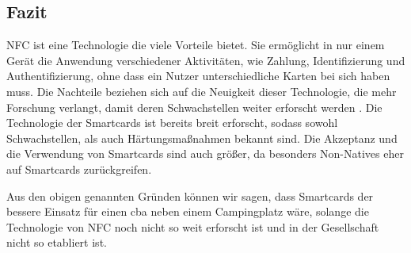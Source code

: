 \subsection{Fazit}

NFC ist eine Technologie die viele Vorteile bietet. Sie ermöglicht in nur einem Gerät die Anwendung
verschiedener Aktivitäten, wie Zahlung, Identifizierung und Authentifizierung, ohne dass ein Nutzer 
unterschiedliche Karten bei sich haben muss. Die Nachteile beziehen sich auf die Neuigkeit dieser Technologie,
die mehr Forschung verlangt, damit deren Schwachstellen weiter erforscht werden \cite{refart:ALSI}. Die
Technologie der Smartcards ist bereits breit erforscht, sodass sowohl Schwachstellen, als auch Härtungsmaßnahmen
bekannt sind. Die Akzeptanz und die Verwendung von Smartcards sind auch größer, da besonders Non-Natives eher auf
Smartcards zurückgreifen.

Aus den obigen genannten Gründen können wir sagen, dass Smartcards der bessere Einsatz für einen \acrshort{cba}
neben einem Campingplatz wäre, solange die Technologie von NFC noch nicht so weit erforscht ist und in der 
Gesellschaft nicht so etabliert ist.
